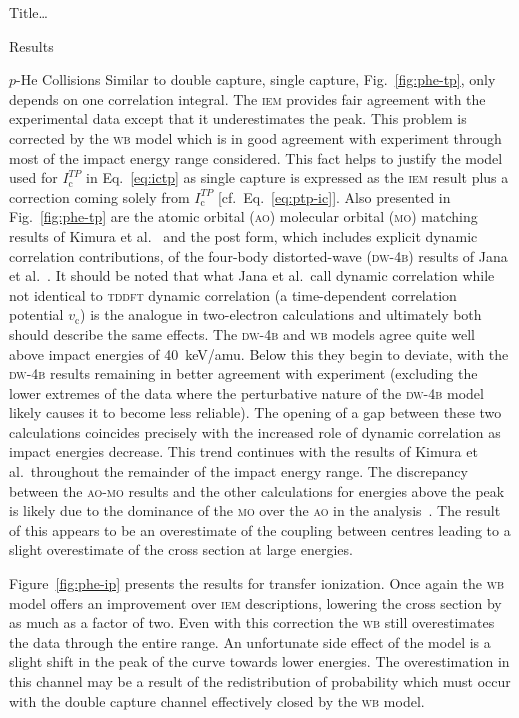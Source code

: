 \documentclass[letterpaper, 11 pt]{report}
\begin{document}
\begin{chapter}{ Title\dots \label{chap:p-he2p-he}}
\begin{section}{Results \label{sec:phe2p-res}}
\begin{subsection}{\texorpdfstring{$p$}{p}-He Collisions \label{sec:phe-res}}
         Similar to double capture, single capture, Fig.~\ref{fig:phe-tp}, only depends on one
         correlation integral. The \textsc{iem} provides fair agreement with the experimental data
         except that it underestimates the peak. This problem is corrected by the \textsc{wb} model
         which is in good agreement with experiment through most of the impact energy range considered.
         This fact helps to justify the model used for $I^{TP}_\mathrm{c}$ in Eq.~\eqref{eq:ictp} as
         single capture is expressed as the \textsc{iem} result plus a correction coming solely from
         $I^{TP}_\mathrm{c}$ [cf.\ Eq.~\eqref{eq:ptp-ic}]. Also presented in Fig.~\ref{fig:phe-tp} are
         the atomic orbital (\textsc{ao}) molecular orbital (\textsc{mo}) matching results of Kimura et
         al.~\cite{KL-86} and the post form, which includes explicit dynamic correlation contributions,
         of the four-body distorted-wave (\textsc{dw-4b}) results of Jana et al.~\cite{JMP-15}. It
         should be noted that what Jana et al.\ call dynamic correlation while not identical to
         \textsc{tddft} dynamic correlation (a time-dependent correlation potential $v_\mathrm{c}$) is
         the analogue in two-electron calculations and ultimately both should describe the same effects.
         The \textsc{dw-4b} and \textsc{wb} models agree quite well above impact energies of 40~keV/amu.
         Below this they begin to deviate, with the \textsc{dw-4b} results remaining in better agreement
         with experiment (excluding the lower extremes of the data where the perturbative nature of the
         \textsc{dw-4b} model likely causes it to become less reliable). The opening of a gap between
         these two calculations coincides precisely with the increased role of dynamic correlation as
         impact energies decrease. This trend continues with the results of Kimura et al.\ throughout
         the remainder of the impact energy range. The discrepancy between the \textsc{ao-mo} results
         and the other calculations for energies above the peak is likely due to the dominance of the
         \textsc{mo} over the \textsc{ao} in the analysis~\cite{KL-86}. The result of this appears to be
         an overestimate of the coupling between centres leading to a slight overestimate of the cross
         section at large energies.

         Figure~\ref{fig:phe-ip} presents the results for transfer ionization. Once again the
         \textsc{wb} model offers an improvement over \textsc{iem} descriptions, lowering the cross
         section by as much as a factor of two. Even with this correction the \textsc{wb} still
         overestimates the data through the entire range. An unfortunate side effect of the model is a
         slight shift in the peak of the curve towards lower energies. The overestimation in this
         channel may be a result of the redistribution of probability which must occur with the double
         capture channel effectively closed by the \textsc{wb} model.
 

\end{subsection}
\end{section}
\end{chapter}
\end{document}
